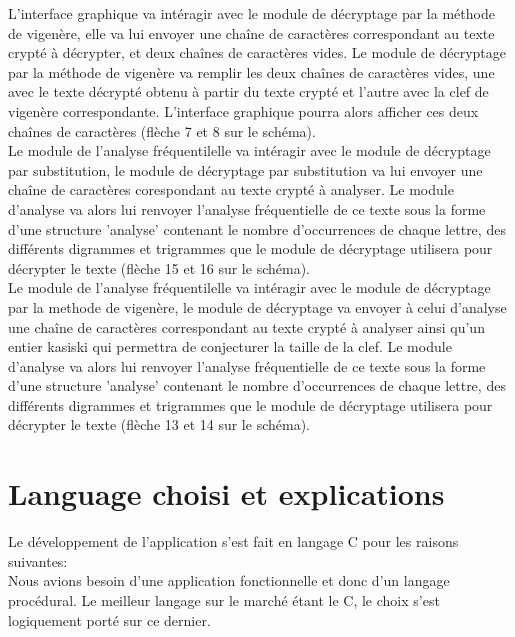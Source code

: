 \documentclass[a4]{article}
\begin{document}
	L'interface graphique va intéragir avec le module de décryptage par la méthode de vigenère, elle va lui envoyer une 
	chaîne de caractères correspondant au texte crypté à décrypter, et deux chaînes de caractères vides. Le module de 
	décryptage par la méthode de vigenère va remplir les deux chaînes de caractères vides, une avec le texte décrypté 
	obtenu à partir du texte crypté et l'autre avec la clef de vigenère correspondante. L'interface graphique pourra 
	alors afficher ces deux chaînes de caractères (flèche 7 et 8 sur le schéma). \\
	
	Le module de l'analyse fréquentilelle va intéragir avec le module de décryptage par substitution,
	le module de décryptage par substitution va lui envoyer une chaîne de caractères corespondant au texte 
	crypté à analyser. Le module d'analyse va alors lui renvoyer l'analyse fréquentielle de ce texte sous 
	la forme d'une structure 'analyse' contenant le nombre d'occurrences de chaque lettre, des différents digrammes 
	et trigrammes que le module de décryptage utilisera pour décrypter le texte (flèche 15 et 16 sur le schéma). \\

	Le module de l'analyse fréquentilelle va intéragir avec le module de décryptage par la methode de vigenère, 
	le module de décryptage va envoyer à celui d'analyse une chaîne de caractères correspondant au texte crypté à
	analyser ainsi qu'un entier kasiski qui permettra de conjecturer la taille de la clef. Le module d'analyse va 
	alors lui renvoyer l'analyse fréquentielle de ce texte sous la forme d'une structure 'analyse' contenant le nombre
	d'occurrences de chaque lettre, des différents digrammes et trigrammes que le module de décryptage utilisera pour 
	décrypter le texte (flèche 13 et 14 sur le schéma). \\


	\section{Language choisi et explications}
	
	Le développement de l'application s'est fait en langage C pour les raisons suivantes: \\
	
  Nous avions besoin d'une application fonctionnelle et donc d'un langage procédural. Le meilleur langage sur le marché
  étant le C, le choix s'est logiquement porté sur ce dernier.\\ \\
\end{document}
